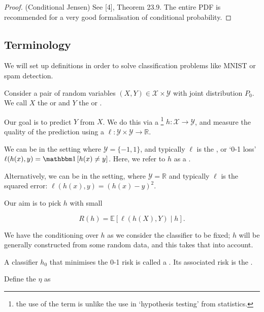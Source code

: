 \documentclass[11pt]{scrartcl}
\begin{document}
\begin{proof}(Conditional Jensen)
See [4], Theorem 23.9. The entire PDF is recommended for a very good formalisation of conditional probability.
\end{proof}

\subsection{Terminology}

We will set up definitions in order to solve classification problems like MNIST or spam detection.

Consider a pair of random variables $(X, Y) \in \mathcal{X} \times \mathcal{Y}$ with joint distribution $P_0$. We call $X$ the  or  and $Y$ the  or .

Our goal is to predict $Y$ from $X$. We do this via a \footnote{the use of the term is unlike the use in `hypothesis testing' from statistics.} $h: \mathcal{X} \rightarrow \mathcal{Y}$, and measure the quality of the prediction using a  $\ell : \mathcal{Y} \times \mathcal{Y} \rightarrow \mathbb{R}$.

We can be in the  setting where $\mathcal{Y} = \{ -1, 1 \}$, and typically $\ell$ is the , or `0-1 loss' $\ell (h(x), y) = \one{h(x) \neq y}$. Here, we refer to $h$ as a .

Alternatively, we can be in the  setting, where $\mathcal{Y} = \mathbb{R}$ and typically $\ell$ is the squared error: $\ell(h(x), y) = (h(x) - y)^2$.

Our aim is to pick $h$ with small 

\begin{equation}
    R(h) = \mathbb{E}[\ell(h(X), Y) \mid h].
    \label{L1:Risk Definition}
\end{equation}

We have the conditioning over $h$ as we consider the classifier to be fixed; $h$ will be generally constructed from some random data, and this takes that into account. %

A classifier $h_0$ that minimises the 0-1 risk is called a . Its associated risk is the .

Define the  $\eta$ as 
\end{document}
